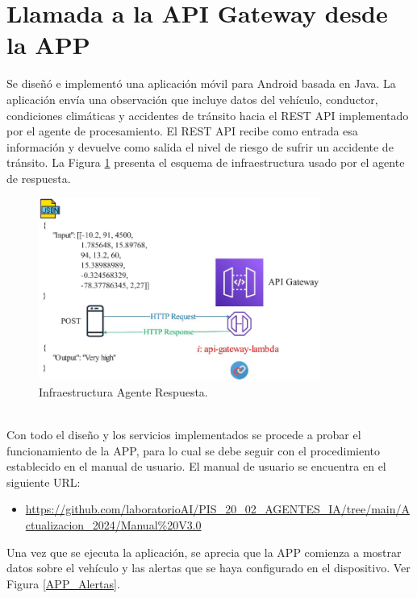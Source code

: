 \documentclass[a4paper,10pt, oneside, titlepage]{article}
\begin{document}
	\section{Llamada a la API Gateway desde la APP}
	Se diseñó e implementó una aplicación móvil para Android basada en Java. La aplicación envía una observación que incluye datos del vehículo, conductor, condiciones climáticas y accidentes de tránsito hacia el REST API implementado por el agente de procesamiento. El REST API recibe como entrada esa información y devuelve como salida el nivel de riesgo de sufrir un accidente de tránsito. La Figura \ref{Infraestructura_Agente_Respuesta} presenta el esquema de infraestructura usado por el agente de respuesta.
	\begin{figure}[!h]
		\centering
		\includegraphics[width = 1\linewidth, height = 6cm]{Infraestructura_Agente_Respuesta.png}
		\caption{Infraestructura Agente Respuesta.}
		\label{Infraestructura_Agente_Respuesta}
	\end{figure} \\
	\indent Con todo el diseño y los servicios implementados se procede a probar el funcionamiento de la APP, para lo cual se debe seguir con el procedimiento establecido en el manual de usuario. El manual de usuario se encuentra en el siguiente URL:
	\begin{itemize}
		\item \textcolor{blue}{\url{https://github.com/laboratorioAI/PIS_20_02_AGENTES_IA/tree/main/Actualizacion_2024/Manual\%20V3.0}}
	\end{itemize}
	\indent \indent Una vez que se ejecuta la aplicación, se aprecia que la APP comienza a mostrar datos sobre el vehículo y las alertas que se haya configurado en el dispositivo. Ver Figura \ref{APP_Alertas}.
\end{document}
